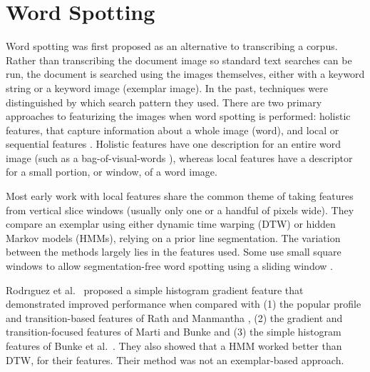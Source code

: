 \documentclass[ms,electronic,twosidetoc,letterpaper,chaptercenter,parttop,lol,lof,lot]{byumsphd}
\begin{document}
\section{Word Spotting}


Word spotting was first proposed as an alternative to transcribing a corpus. Rather than transcribing the document image so standard text searches can be run, the document is searched using the images themselves, either with a keyword string or a keyword image (exemplar image). In the past, techniques were distinguished by which search pattern they used. There are two primary approaches to featurizing the images when word spotting is performed: holistic features, that capture information about a whole image (word), and local or sequential features \cite{Rodrıguez2008}. Holistic features have one description for an entire word image (such as a bag-of-visual-words \cite{Shekhar2012}), whereas local features have a descriptor for a small portion, or window, of a word image. 

Most early work with local features share the common theme of taking features from vertical slice windows (usually only one or a handful of pixels wide). They compare an exemplar using either dynamic time warping (DTW) or hidden Markov models (HMMs), relying on a prior line segmentation. The variation between the methods largely lies in the features used. Some use small square windows to allow segmentation-free word spotting using a sliding window \cite{Rothacker2013}.

Rodr{\i}guez et al.~\cite{Rodrıguez2008} proposed a simple histogram gradient feature that demonstrated improved performance when compared with (1) the popular profile and transition-based features of Rath and Manmantha \cite{Rath2003}, (2) the gradient and transition-focused features of Marti and Bunke \cite{Marti2001} and (3) the simple histogram features of Bunke et al.~\cite{Bunke2004}. They also showed that a HMM worked better than DTW, for their features. Their method was not an exemplar-based approach.
\end{document}
